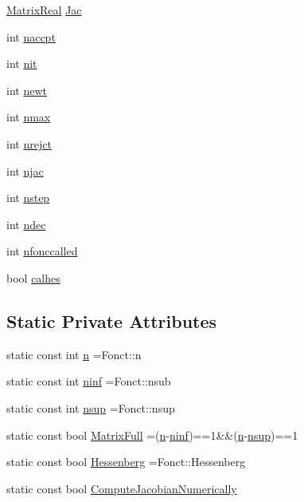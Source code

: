 \begin{DoxyCompactItemize}
\hyperlink{classodes_1_1Radau5cc_a8ef067b8852403d48d8528f601a4626a}{Matrix\-Real} \hyperlink{classodes_1_1Radau5cc_a67b952c35d2c7ecddc9dd75cb2c3afe1}{Jac}
\item 
int \hyperlink{classodes_1_1Radau5cc_a39e641457e737321720c75578189d0db}{naccpt}
\item 
int \hyperlink{classodes_1_1Radau5cc_a98eae21674bed3d783e49f92f7c38a20}{nit}
\item 
int \hyperlink{classodes_1_1Radau5cc_a957de41c2a36e2f254836a6c05dbfb92}{newt}
\item 
int \hyperlink{classodes_1_1Radau5cc_a42980e5cf06bc0f4c1a0ef1a1922615f}{nmax}
\item 
int \hyperlink{classodes_1_1Radau5cc_a04e6193a9f5be15a7e969b2ad4e5f344}{nrejct}
\item 
int \hyperlink{classodes_1_1Radau5cc_ade6f8961bd6dacdc3e89761d8af04172}{njac}
\item 
int \hyperlink{classodes_1_1Radau5cc_af1a16f749cd5fd53c66af9a913a37d0a}{nstep}
\item 
int \hyperlink{classodes_1_1Radau5cc_af849903adc1f88a3bc6042994bec5621}{ndec}
\item 
int \hyperlink{classodes_1_1Radau5cc_a6363884e5172cc77c13a1d9ca9ed630a}{nfonccalled}
\item 
bool \hyperlink{classodes_1_1Matrices_a82e935680c27f58bcff8a559700411c6}{calhes}
\end{DoxyCompactItemize}
\subsection*{Static Private Attributes}
\begin{DoxyCompactItemize}
\item 
static const int \hyperlink{classodes_1_1Radau5cc_a3be3f05d2cdf7268e7d09b62ad9ad494}{n} =Fonct\-::n
\item 
static const int \hyperlink{classodes_1_1Radau5cc_ac47e67a43369971eeb08c2d2200a76d5}{ninf} =Fonct\-::nsub
\item 
static const int \hyperlink{classodes_1_1Radau5cc_a4e80b8064e4d8f60262591531fcd1ff0}{nsup} =Fonct\-::nsup
\item 
static const bool \hyperlink{classodes_1_1Radau5cc_a8e67471bdbf858fff865561d859a066a}{Matrix\-Full} =(\hyperlink{classodes_1_1Radau5cc_a3be3f05d2cdf7268e7d09b62ad9ad494}{n}-\/\hyperlink{classodes_1_1Radau5cc_ac47e67a43369971eeb08c2d2200a76d5}{ninf})==1\&\&(\hyperlink{classodes_1_1Radau5cc_a3be3f05d2cdf7268e7d09b62ad9ad494}{n}-\/\hyperlink{classodes_1_1Radau5cc_a4e80b8064e4d8f60262591531fcd1ff0}{nsup})==1
\item 
static const bool \hyperlink{classodes_1_1Radau5cc_ae66683695f55d21d7c11ca7e3323d0e9}{Hessenberg} =Fonct\-::\-Hessenberg
\item 
static const bool \hyperlink{classodes_1_1Radau5cc_a742c490578cf9e4dcf692e6706c2ec90}{Compute\-Jacobian\-Numerically}
\end{DoxyCompactItemize}


